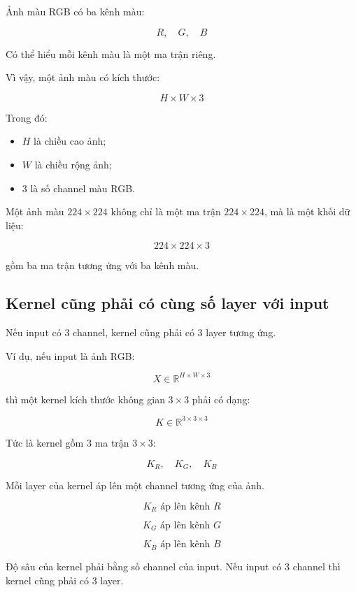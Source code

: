 Ảnh màu RGB có ba kênh màu:

\[
    R,\quad G,\quad B
\]

Có thể hiểu mỗi kênh màu là một ma trận riêng.

Vì vậy, một ảnh màu có kích thước:

\[
    H \times W \times 3
\]

Trong đó:

\begin{itemize}
    \item $H$ là chiều cao ảnh;
    \item $W$ là chiều rộng ảnh;
    \item $3$ là số channel màu RGB.
\end{itemize}

\begin{vidu}
Một ảnh màu $224\times224$ không chỉ là một ma trận $224\times224$, mà là một khối dữ liệu:

\[
    224 \times 224 \times 3
\]

gồm ba ma trận tương ứng với ba kênh màu.
\end{vidu}

\subsection{Kernel cũng phải có cùng số layer với input}

Nếu input có 3 channel, kernel cũng phải có 3 layer tương ứng.

Ví dụ, nếu input là ảnh RGB:

\[
    X \in \mathbb{R}^{H\times W\times 3}
\]

thì một kernel kích thước không gian $3\times3$ phải có dạng:

\[
    K \in \mathbb{R}^{3\times3\times3}
\]

Tức là kernel gồm 3 ma trận $3\times3$:

\[
    K_R,\quad K_G,\quad K_B
\]

Mỗi layer của kernel áp lên một channel tương ứng của ảnh.

\[
    K_R \text{ áp lên kênh } R
\]

\[
    K_G \text{ áp lên kênh } G
\]

\[
    K_B \text{ áp lên kênh } B
\]

\begin{ghinho}
Độ sâu của kernel phải bằng số channel của input. Nếu input có 3 channel thì kernel cũng phải có 3 layer.
\end{ghinho}

